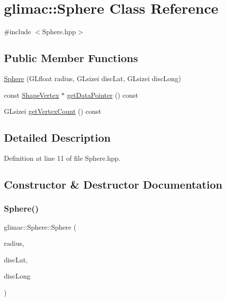 \hypertarget{classglimac_1_1_sphere}{}\section{glimac\+:\+:Sphere Class Reference}
\label{classglimac_1_1_sphere}


{\ttfamily \#include $<$Sphere.\+hpp$>$}

\subsection*{Public Member Functions}
\begin{DoxyCompactItemize}
\item 
\hyperlink{classglimac_1_1_sphere_a323f03104a8e5988edf3a72e9218219e}{Sphere} (G\+Lfloat radius, G\+Lsizei disc\+Lat, G\+Lsizei disc\+Long)
\item 
const \hyperlink{structglimac_1_1_shape_vertex}{Shape\+Vertex} $\ast$ \hyperlink{classglimac_1_1_sphere_acff10a50f36ef2c1b365ff8cb81b1f5f}{get\+Data\+Pointer} () const
\item 
G\+Lsizei \hyperlink{classglimac_1_1_sphere_af413d827ffe392ca91770858d8d97285}{get\+Vertex\+Count} () const
\end{DoxyCompactItemize}


\subsection{Detailed Description}


Definition at line 11 of file Sphere.\+hpp.



\subsection{Constructor \& Destructor Documentation}
\mbox{\label{classglimac_1_1_sphere_a323f03104a8e5988edf3a72e9218219e}} 
\subsubsection{\texorpdfstring{Sphere()}{Sphere()}}
{\footnotesize\ttfamily glimac\+::\+Sphere\+::\+Sphere (\begin{DoxyParamCaption}\item[{G\+Lfloat}]{radius,  }\item[{G\+Lsizei}]{disc\+Lat,  }\item[{G\+Lsizei}]{disc\+Long }\end{DoxyParamCaption})\hspace{0.3cm}{\ttfamily [inline]}}



